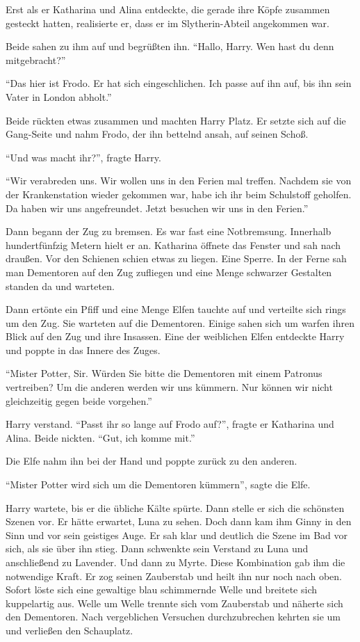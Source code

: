 Erst als er Katharina und Alina entdeckte, die gerade ihre Köpfe zusammen gesteckt hatten, realisierte er, dass er im Slytherin-Abteil angekommen war.

Beide sahen zu ihm auf und begrüßten ihn. \enquote{Hallo, Harry. Wen hast du denn mitgebracht?}

\enquote{Das hier ist Frodo. Er hat sich eingeschlichen. Ich passe auf ihn auf, bis ihn sein Vater in London abholt.}

Beide rückten etwas zusammen und machten Harry Platz. Er setzte sich auf die Gang-Seite und nahm Frodo, der ihn bettelnd ansah, auf seinen Schoß.

\enquote{Und was macht ihr?}, fragte Harry.

\enquote{Wir verabreden uns. Wir wollen uns in den Ferien mal treffen. Nachdem sie von der Krankenstation wieder gekommen war, habe ich ihr beim Schulstoff geholfen. Da haben wir uns angefreundet. Jetzt besuchen wir uns in den Ferien.}

Dann begann der Zug zu bremsen. Es war fast eine Notbremsung. Innerhalb hundertfünfzig Metern hielt er an. Katharina öffnete das Fenster und sah nach draußen. Vor den Schienen schien etwas zu liegen. Eine Sperre. In der Ferne sah man Dementoren auf den Zug zufliegen und eine Menge schwarzer Gestalten standen da und warteten.

Dann ertönte ein Pfiff und eine Menge Elfen tauchte auf und verteilte sich rings um den Zug. Sie warteten auf die Dementoren. Einige sahen sich um warfen ihren Blick auf den Zug und ihre Insassen. Eine der weiblichen Elfen entdeckte Harry und poppte in das Innere des Zuges.

\enquote{Mister Potter, Sir. Würden Sie bitte die Dementoren mit einem Patronus vertreiben? Um die anderen werden wir uns kümmern. Nur können wir nicht gleichzeitig gegen beide vorgehen.}

Harry verstand. \enquote{Passt ihr so lange auf Frodo auf?}, fragte er Katharina und Alina. Beide nickten. \enquote{Gut, ich komme mit.}

Die Elfe nahm ihn bei der Hand und poppte zurück zu den anderen.

\enquote{Mister Potter wird sich um die Dementoren kümmern}, sagte die Elfe.

Harry wartete, bis er die übliche Kälte spürte. Dann stelle er sich die schönsten Szenen vor. Er hätte erwartet, Luna zu sehen. Doch dann kam ihm Ginny in den Sinn und vor sein geistiges Auge. Er sah klar und deutlich die Szene im Bad vor sich, als sie über ihn stieg. Dann schwenkte sein Verstand zu Luna und anschließend zu Lavender. Und dann zu Myrte. Diese Kombination gab ihm die notwendige Kraft. Er zog seinen Zauberstab und heilt ihn nur noch nach oben. Sofort löste sich eine gewaltige blau schimmernde Welle und breitete sich kuppelartig aus. Welle um Welle trennte sich vom Zauberstab und näherte sich den Dementoren. Nach vergeblichen Versuchen durchzubrechen kehrten sie um und verließen den Schauplatz.

